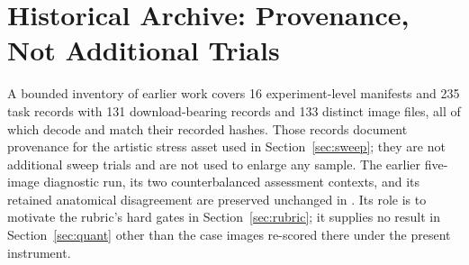 \documentclass[11pt]{article}
\begin{document}
\section{Historical Archive: Provenance, Not Additional Trials}
A bounded inventory of earlier work covers 16 experiment-level manifests and 235 task records with 131 download-bearing records and 133 distinct image files, all of which decode and match their recorded hashes. Those records document provenance for the artistic stress asset used in Section~\ref{sec:sweep}; they are not additional sweep trials and are not used to enlarge any sample. The earlier five-image diagnostic run, its two counterbalanced assessment contexts, and its retained anatomical disagreement are preserved unchanged in . Its role is to motivate the rubric's hard gates in Section~\ref{sec:rubric}; it supplies no result in Section~\ref{sec:quant} other than the case images re-scored there under the present instrument.


\end{document}
